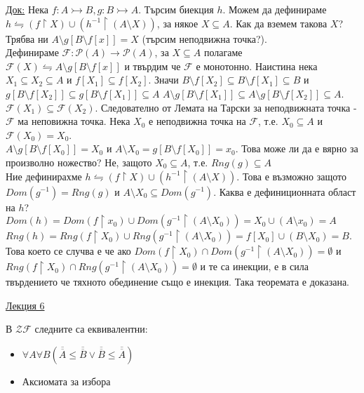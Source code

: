\documentclass[fleqn, titlepage, 12pt]{report}
\begin{document}
\underline{Док:} Нека $f: A \rightarrowtail B, g: B \rightarrowtail A$. Търсим биекция $h$. Можем да дефинираме \\
$h \leftrightharpoons (f \upharpoonright X) \cup (h^{-1} \upharpoonright (A \setminus X))$, за някое $X \subseteq A$.
Как да вземем такова $X$?\\
Трябва ни $A \setminus g[B \setminus f[x]] = X$ (търсим неподвижна точка?).\\
Дефинираме $\mathcal{F}: \mathcal{P}(A) \rightarrow \mathcal{P}(A)$, за $X \subseteq A$ полагаме
$\mathcal{F}(X) \leftrightharpoons A \setminus g[B \setminus f[x]]$ и твърдим че $\mathcal{F}$ е монотонно.
Наистина нека $X_1 \subseteq X_2 \subseteq A$ и $f[X_1] \subseteq f[X_2]$.
Значи $B \setminus f[X_2] \subseteq B \setminus f[X_1] \subseteq B$ и
$g[B \setminus f[X_2]] \subseteq g[B \setminus f[X_1]] \subseteq A$
$A \setminus g[B \setminus f[X_1]] \subseteq A \setminus g[B \setminus f[X_2]] \subseteq A$.\\
$\mathcal{F}(X_1) \subseteq \mathcal{F}(X_2)$. Следователно от Лемата на Тарски за неподвижната точка -
$\mathcal{F}$ ма неповижна точка. Нека $X_0$ е неподвижна точка на $\mathcal{F}$, т.е. $X_0 \subseteq A$ и $\mathcal{F}(X_0) = X_0$.\\
$A \setminus g[B \setminus f[X_0]] = X_0$ и $A \setminus X_0 = g[B \setminus f[X_0]] = x_0$.
Това може ли да е вярно за произволно ножество? Не, защото $X_0 \subseteq A$, т.е. $Rng(g) \subseteq A$\\
Ние дефинирахме $ h \leftrightharpoons (f \upharpoonright X) \cup (h^{-1} \upharpoonright (A \setminus X)) $.
Това е възможно защото $Dom(g^{-1}) = Rng(g)$ и $A \setminus X_0 \subseteq Dom(g^{-1})$.
Каква е дефиниционната област на $h$?
$Dom(h) = Dom(f \upharpoonright x_0) \cup Dom(g^{-1} \upharpoonright (A \setminus X_0))
= X_0 \cup (A \setminus x_0) = A$\\
$Rng(h) = Rng(f \upharpoonright X_0) \cup Rng(g^{-1} \upharpoonright (A \setminus X_0))
= f[X_0] \cup  (B \setminus X_0) = B$. Това което се случва е че ако
$Dom(f \upharpoonright X_0) \cap Dom(g^{-1} \upharpoonright (A \setminus X_0)) = \emptyset$ и
$Rng(f \upharpoonright X_0) \cap Rng(g^{-1} \upharpoonright (A \setminus X_0)) = \emptyset$ и те са инекции,
е в сила твърдението че тяхното обединение също е инекция. Така теоремата е доказана.
\bigbreak

\clearpage
\begin{center}
  \underline{\huge\normalfont Лекция 6}
\end{center}
\bigbreak

 В $\mathcal{ZF}$ следните са еквивалентни:
\begin{itemize}
  \item $\forall{A}\forall{B}(\overline{\overline{A}} \leq \overline{\overline{B}}
    \lor \overline{\overline{B}} \leq \overline{\overline{A}})$
  \item Аксиомата за избора
\end{itemize}
\end{document}
